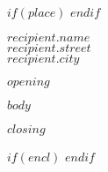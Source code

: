 \documentclass[
    sender,
    paper=a4,
    version=last,
$if(fontsize)$
    fontsize=$fontsize$,
$else$
    fontsize=11pt,
$endif$
    DIV=13,
    BCOR=0mm]{scrlttr2}
\begin{document}
$if(place)$
$endif$

\begin{letter}{$recipient.name$\\$recipient.street$\\$recipient.city$}
\opening{$opening$}


$body$

\closing{$closing$} %
$if(encl)$
$endif$
\end{letter}
\end{document}
